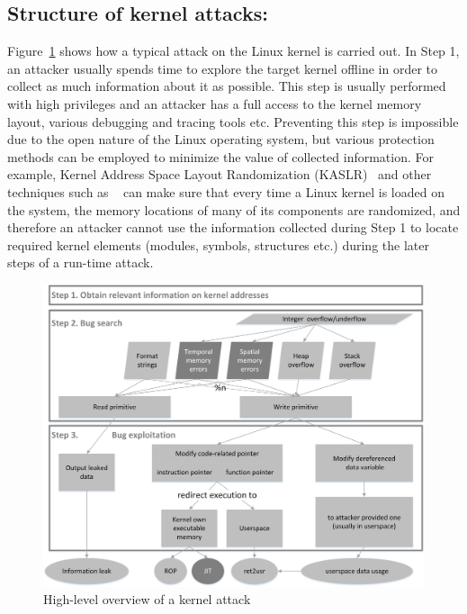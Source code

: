 \subsection*{Structure of kernel attacks:}

Figure~\ref{fig:exploit-steps} shows how a typical attack on the Linux kernel is carried out. In Step 1, an attacker usually spends time to explore the target kernel offline in order to collect as much information about it as possible. This step is usually performed with high privileges and an attacker has a full access to the kernel memory layout, various debugging and tracing tools etc. Preventing this step is impossible due to the open nature of the Linux operating system, but various protection methods can be employed to minimize the value of collected information. For example, Kernel Address Space Layout Randomization (KASLR)~\cite{cook2013} and other techniques such as ~\cite{randstruct2017} can make sure that every time a Linux kernel is loaded on the system, the memory locations of many of its components are randomized, and therefore an attacker cannot use the information collected during Step 1 to locate required kernel elements (modules, symbols, structures etc.) during the later steps of a run-time attack. 

\begin{figure}[t]
	\centering
		\includegraphics[width=1\textwidth]{figures/kernel_exploit_steps.png}
	\caption{High-level overview of a kernel attack}
	\label{fig:exploit-steps}
\end{figure}    


